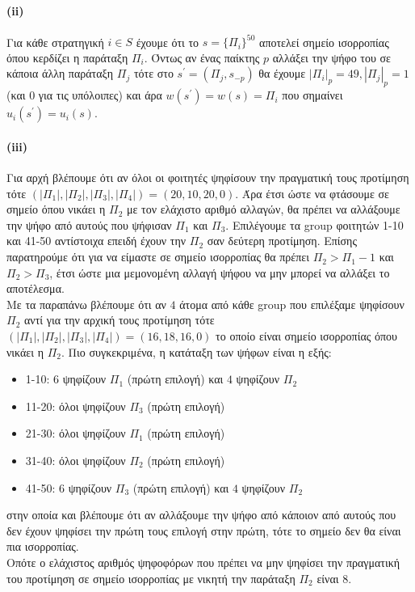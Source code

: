 \documentclass[a4paper,11pt]{article}
\begin{document}
\paragraph{(ii)} Για κάθε στρατηγική $i \in S$ έχουμε ότι το $s = \{\Pi_i\}^{50}$ αποτελεί σημείο ισορροπίας όπου κερδίζει η παράταξη $\Pi_i$.
Όντως αν ένας παίκτης $p$ αλλάξει την ψήφο του σε κάποια άλλη παράταξη $\Pi_j$ τότε στο $s^\prime = (\Pi_j,s_{-p})$ θα έχουμε $|\Pi_i|_p=49, |\Pi_j|_p=1$ (και $0$ για τις υπόλοιπες) και άρα $w(s^\prime) = w(s) = \Pi_i$ που σημαίνει $u_i(s^\prime) = u_i(s)$.

\paragraph{(iii)} Για αρχή βλέπουμε ότι αν όλοι οι φοιτητές ψηφίσουν την πραγματική τους προτίμηση τότε $(|\Pi_1|,|\Pi_2|,|\Pi_3|,|\Pi_4|) = (20,10,20,0)$.
Άρα έτσι ώστε να φτάσουμε σε σημείο όπου νικάει η $\Pi_2$ με τον ελάχιστο αριθμό αλλαγών, θα πρέπει να αλλάξουμε την ψήφο από αυτούς που ψήφισαν $\Pi_1$ και $\Pi_3$.
Επιλέγουμε τα group φοιτητών 1-10 και 41-50 αντίστοιχα επειδή έχουν την $\Pi_2$ σαν δεύτερη προτίμηση.
Επίσης παρατηρούμε ότι για να είμαστε σε σημείο ισορροπίας θα πρέπει $\Pi_2 > \Pi_1-1$ και $\Pi_2 > \Pi_3$, έτσι ώστε μια μεμονομένη αλλαγή ψήφου να μην μπορεί να αλλάξει το αποτέλεσμα.
\\[8pt]
Με τα παραπάνω βλέπουμε ότι αν $4$ άτομα από κάθε group που επιλέξαμε ψηφίσουν $\Pi_2$ αντί για την αρχική τους προτίμηση τότε $(|\Pi_1|,|\Pi_2|,|\Pi_3|,|\Pi_4|) = (16,18,16,0)$ το οποίο είναι σημείο ισορροπίας όπου νικάει η $\Pi_2$.
Πιο συγκεκριμένα, η κατάταξη των ψήφων είναι η εξής:
\begin{itemize}
	\item 1-10: $6$ ψηφίζουν $\Pi_1$ (πρώτη επιλογή) και $4$ ψηφίζουν $\Pi_2$
	\item 11-20: όλοι ψηφίζουν $\Pi_3$ (πρώτη επιλογή)
	\item 21-30: όλοι ψηφίζουν $\Pi_1$ (πρώτη επιλογή)
	\item 31-40: όλοι ψηφίζουν $\Pi_2$ (πρώτη επιλογή)
	\item 41-50: $6$ ψηφίζουν $\Pi_3$ (πρώτη επιλογή) και $4$ ψηφίζουν $\Pi_2$
\end{itemize}
στην οποία και βλέπουμε ότι αν αλλάξουμε την ψήφο από κάποιον από αυτούς που δεν έχουν ψηφίσει την πρώτη τους επιλογή στην πρώτη, τότε το σημείο δεν θα είναι πια ισορροπίας.
\\[8pt]
Οπότε ο ελάχιστος αριθμός ψηφοφόρων που πρέπει να μην ψηφίσει την πραγματική του προτίμηση σε σημείο ισορροπίας με νικητή την παράταξη $\Pi_2$ είναι $8$.
\end{document}
